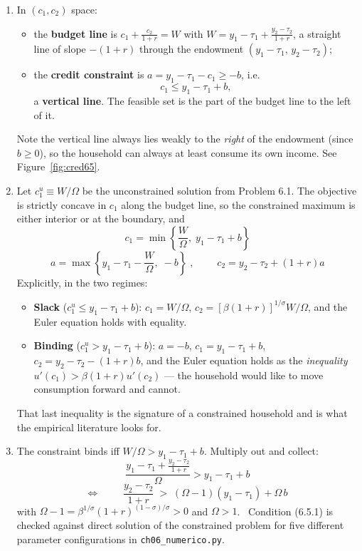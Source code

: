 \documentclass[12pt, letterpaper]{article}
\begin{document}
\begin{tcolorbox}[oddbox,title={Problem 6.5 \quad Credit Constraints and Ricardian Equivalence}]
\begin{enumerate}
\item In $(c_1,c_2)$ space:
\begin{itemize}[leftmargin=1.3em,itemsep=2pt,topsep=3pt]
\item the \textbf{budget line} is $c_1+\frac{c_2}{1+r}=W$ with
      $W=y_1-\tau_1+\frac{y_2-\tau_2}{1+r}$, a straight line of slope $-(1+r)$ through the
      endowment $(y_1-\tau_1,\,y_2-\tau_2)$;
\item the \textbf{credit constraint} is $a=y_1-\tau_1-c_1\ge-b$, i.e.
      \[
      c_1\le y_1-\tau_1+b ,
      \]
      a \textbf{vertical line}. The feasible set is the part of the budget line to the left
      of it.
\end{itemize}
Note the vertical line always lies weakly to the \emph{right} of the endowment (since
$b\ge0$), so the household can always at least consume its own income. See
Figure~\ref{fig:cred65}.

\item Let $c_1^{u}\equiv W/\Omega$ be the unconstrained solution from Problem 6.1. The
objective is strictly concave in $c_1$ along the budget line, so the constrained maximum is
either interior or at the boundary, and
\[
\boxed{\;c_1=\min\left\{\frac{W}{\Omega},\;y_1-\tau_1+b\right\}\;}
\]
\[
\boxed{\;a=\max\left\{y_1-\tau_1-\frac{W}{\Omega},\;-b\right\}\;},
\qquad
\boxed{\;c_2=y_2-\tau_2+(1+r)a\;}
\]
Explicitly, in the two regimes:
\begin{itemize}[leftmargin=1.3em,itemsep=3pt,topsep=3pt]
\item \textbf{Slack} ($c_1^{u}\le y_1-\tau_1+b$): $c_1=W/\Omega$,
      $c_2=[\beta(1+r)]^{1/\sigma}W/\Omega$, and the Euler equation holds with equality.
\item \textbf{Binding} ($c_1^{u}>y_1-\tau_1+b$): $a=-b$, $c_1=y_1-\tau_1+b$,
      $c_2=y_2-\tau_2-(1+r)b$, and the Euler equation holds as the \emph{inequality}
      $u'(c_1)>\beta(1+r)u'(c_2)$ --- the household would like to move consumption forward
      and cannot.
\end{itemize}
That last inequality is the signature of a constrained household and is what the empirical
literature looks for.

\item The constraint binds iff $W/\Omega>y_1-\tau_1+b$. Multiply out and collect:
\[
\frac{y_1-\tau_1+\frac{y_2-\tau_2}{1+r}}{\Omega}>y_1-\tau_1+b
\]
\[
\Longleftrightarrow\qquad
\boxed{\;\frac{y_2-\tau_2}{1+r}\;>\;(\Omega-1)(y_1-\tau_1)+\Omega\,b\;}
\tag{6.5.1}
\]
with $\Omega-1=\beta^{1/\sigma}(1+r)^{(1-\sigma)/\sigma}>0$ and $\Omega>1$. \checkmark\
Condition (6.5.1) is checked against direct solution of the constrained problem for five
different parameter configurations in \texttt{ch06\_numerico.py}.


\end{enumerate}
\end{tcolorbox}
\end{document}
